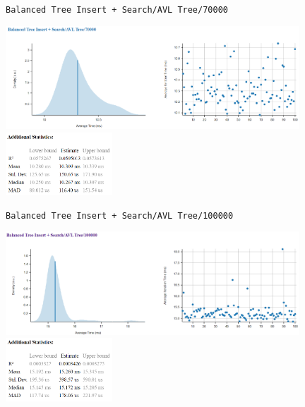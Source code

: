 \documentclass[11pt, letterpaper]{article}
\begin{document}
\texttt{Balanced Tree Insert + Search/AVL Tree/70000}
\begin{paracol}{3}
    \centering        
    \includegraphics[width=11cm]{benchmarks/AVL/70000/plots.png}
    \switchcolumn
    \vspace*{\fill}
    \includegraphics[width=4cm]{benchmarks/AVL/70000/stats.png}
    \vspace*{\fill}
\end{paracol}

\newpage
\texttt{Balanced Tree Insert + Search/AVL Tree/100000}
\begin{paracol}{3}
    \centering        
    \includegraphics[width=11cm]{benchmarks/AVL/100000/plots.png}
    \switchcolumn
    \vspace*{\fill}
    \includegraphics[width=4cm]{benchmarks/AVL/100000/stats.png}
    \vspace*{\fill}
\end{paracol}
\end{document}
